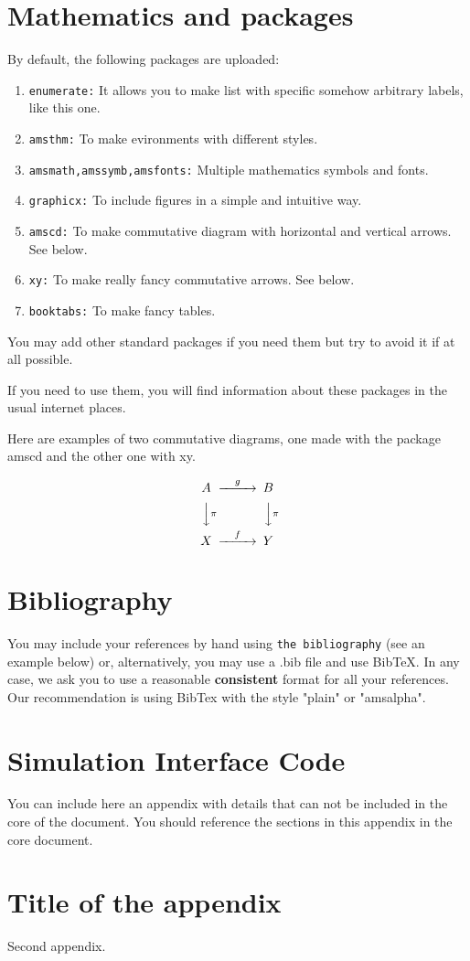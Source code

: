 \documentclass[12,twoside]{TFG-GM}
\theoremstyle{definition}
\theoremstyle{remark}
\begin{document}
\section{Mathematics and packages} \label{packages}

By default, the following packages are uploaded:
\begin{enumerate}[\bf (1)]
\item {\tt enumerate:} It allows you to make list with specific somehow arbitrary labels, like this one.
\item {\tt amsthm:} To make evironments with different styles.
\item {\tt amsmath,amssymb,amsfonts:} Multiple mathematics symbols and fonts.
\item {\tt graphicx:} To include figures in a simple and intuitive way.
\item {\tt amscd:} To make commutative diagram with horizontal and vertical arrows. See below.
\item {\tt xy:} To make really fancy commutative arrows. See below.
\item {\tt booktabs:} To make fancy tables.
\end{enumerate}
You may add other standard packages if you need them but try to avoid it if at all possible.

If you need to use them, you will find information about these packages in the usual internet places. 

Here are examples of two commutative diagrams, one made with the package amscd and the other one with xy.

\[
\begin{CD}
A @>g>> B\\
@VV\pi V @VV\pi V\\
X @>f>> Y
\end{CD}
\]


\section{Bibliography}

You may include your references by hand using {\tt the bibliography} (see an example below) or, alternatively, you may use a .bib file and use BibTeX. In any case, we ask you to use a reasonable {\bf consistent} format for all your references. Our recommendation is using BibTex with the style   "plain" or "amsalpha".


{}


\appendix
\vfill\newpage \section{Simulation Interface Code}
\label{app:code}
You can include here an appendix with details that can not be included in the core of the document. You should reference the sections in this appendix in the core document.
\vfill\newpage \section{Title of the appendix}
Second appendix.
\end{document}
